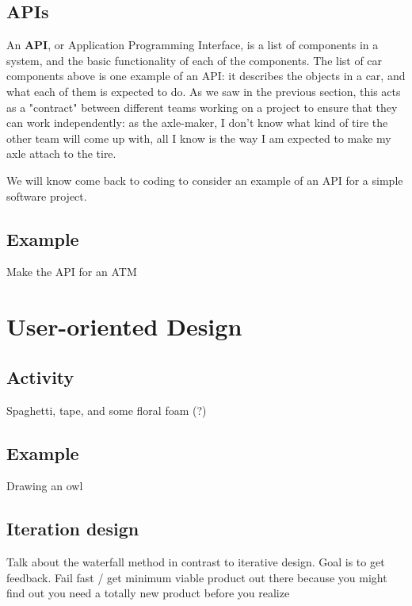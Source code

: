 \subsection{APIs}
An \textbf{API}, or Application Programming Interface, is a list of components in a system, and the basic functionality of each of the components. The list of car components above is one example of an API: it describes the objects in a car, and what each of them is expected to do. As we saw in the previous section, this acts as a "contract" between different teams working on a project to ensure that they can work independently: as the axle-maker, I don't know what kind of tire the other team will come up with, all I know is the way I am expected to make my axle attach to the tire. 

We will know come back to coding to consider an example of an API for a simple software project.  

\subsection{Example}
Make the API for an ATM


\section{User-oriented Design}

\subsection{Activity}
Spaghetti, tape, and some floral foam (?) 

\subsection{Example}
Drawing an owl

\subsection{Iteration design}
Talk about the waterfall method in contrast to iterative design. Goal is to get feedback. Fail fast / get minimum viable product out there because you might find out you need a totally new product before you realize 

